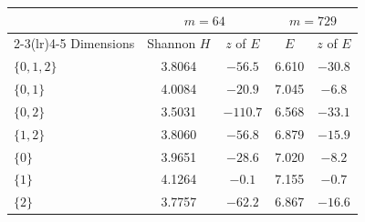 \begin{tabular}{lcccc}
\toprule
 & \multicolumn{2}{c}{$m=64$} & \multicolumn{2}{c}{$m=729$} \\
\cmidrule(lr){2-3}\cmidrule(lr){4-5}
Dimensions & Shannon $H$ & $z$ of $E$ & $E$ & $z$ of $E$ \\
\midrule
$\{0,1,2\}$ & 3.8064 & $-56.5$ & 6.610 & $-30.8$ \\
\midrule
$\{0,1\}$ & 4.0084 & $-20.9$ & 7.045 & $-6.8$ \\
$\{0,2\}$ & 3.5031 & $-110.7$ & 6.568 & $-33.1$ \\
$\{1,2\}$ & 3.8060 & $-56.8$ & 6.879 & $-15.9$ \\
\midrule
$\{0\}$ & 3.9651 & $-28.6$ & 7.020 & $-8.2$ \\
$\{1\}$ & 4.1264 & $-0.1$ & 7.155 & $-0.7$ \\
$\{2\}$ & 3.7757 & $-62.2$ & 6.867 & $-16.6$ \\
\bottomrule
\end{tabular}
